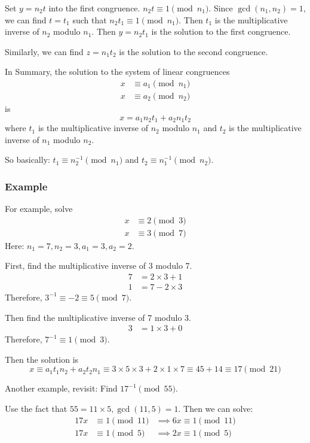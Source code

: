 \documentclass[letterpaper,12pt,oneside]{article}
\begin{document}
Set $y=n_2 t$ into the first congruence. $n_2 t \equiv 1 \pmod {n_1}$. Since
$\gcd(n_1,n_2)=1$, we can find $t=t_1$ such that $n_2 t_1 \equiv 1 \pmod
    {n_1}$. Then $t_1$ is the multiplicative inverse of $n_2$ modulo $n_1$. Then
$y=n_2 t_1$ is the solution to the first congruence.

Similarly, we can find $z=n_1 t_2$ is the solution to the second congruence.

In Summary, the solution to the system of linear congruences \begin{align*}
    x & \equiv a_1 \pmod {n_1} \\
    x & \equiv a_2 \pmod {n_2}
\end{align*}
is \[
    x=a_1 n_2 t_1+a_2 n_1 t_2
\]
where $t_1$ is the multiplicative inverse of $n_2$ modulo $n_1$ and $t_2$ is
the multiplicative inverse of $n_1$ modulo $n_2$.

So basically: $t_1\equiv n_2^{-1} \pmod {n_1}$ and $t_2\equiv n_1^{-1} \pmod {n_2}$.
\subsubsection{Example}
For example, solve \begin{align*}
    x & \equiv 2 \pmod 3 \\
    x & \equiv 3 \pmod 7
\end{align*}
Here: $n_1 = 7, n_2 = 3, a_1 = 3, a_2 = 2$. 

First, find the multiplicative inverse of 3 modulo 7. \begin{align*}
    7 & = 2\times 3+1 \\
    1 & = 7-2\times 3
\end{align*}
Therefore, $3^{-1}\equiv -2 \equiv 5 \pmod 7$.

Then find the multiplicative inverse of 7 modulo 3. \begin{align*}
    3 & = 1\times 3+0
\end{align*}
Therefore, $7^{-1}\equiv 1 \pmod 3$.

Then the solution is \[
    x\equiv a_1 t_1 n_2+a_2 t_2 n_1\equiv 3\times 5\times 3+2\times 1\times 7\equiv 45+14 \equiv 17 \pmod {21}
\]

Another example, revisit: Find $17^{-1}\pmod {55}$.

Use the fact that $55=11\times 5, \gcd(11,5)=1$. Then we can solve: \begin{align*}
    17 x & \equiv 1 \pmod {11} & \implies 6x\equiv 1 \pmod {11} \\
    17 x & \equiv 1 \pmod {5} & \implies 2x\equiv 1 \pmod {5}
\end{align*}
\end{document}
